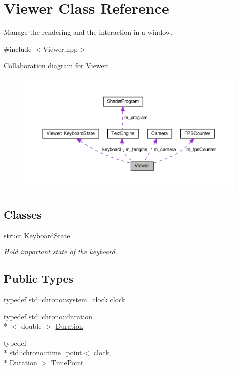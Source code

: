 \hypertarget{classViewer}{\section{Viewer Class Reference}
\label{classViewer}
}


Manage the rendering and the interaction in a window.  




{\ttfamily \#include $<$Viewer.\+hpp$>$}



Collaboration diagram for Viewer\+:\nopagebreak
\begin{figure}[H]
\begin{center}
\leavevmode
\includegraphics[width=350pt]{classViewer__coll__graph}
\end{center}
\end{figure}
\subsection*{Classes}
\begin{DoxyCompactItemize}
\item 
struct \hyperlink{structViewer_1_1KeyboardState}{Keyboard\+State}
\begin{DoxyCompactList}\small\item\em Hold important state of the keyboard. \end{DoxyCompactList}\end{DoxyCompactItemize}
\subsection*{Public Types}
\begin{DoxyCompactItemize}
\item 
typedef std\+::chrono\+::system\+\_\+clock \hyperlink{classViewer_a3b19fa21a19da8b561cac43e47e50277}{clock}
\item 
typedef std\+::chrono\+::duration\\*
$<$ double $>$ \hyperlink{classViewer_aa36c6a10e0823afb4d570dbd6f0a01a3}{Duration}
\item 
typedef \\*
std\+::chrono\+::time\+\_\+point$<$ \hyperlink{classViewer_a3b19fa21a19da8b561cac43e47e50277}{clock}, \\*
\hyperlink{classViewer_aa36c6a10e0823afb4d570dbd6f0a01a3}{Duration} $>$ \hyperlink{classViewer_ae3f3e7a7694a354a2d374693649000ec}{Time\+Point}
\end{DoxyCompactItemize}
